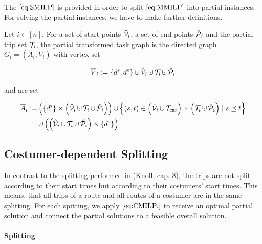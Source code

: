 The $\eqref{eq:SMILP}$ is provided in order to split $\eqref{eq:MMILP}$ into partial instances. For solving the partial instances, we have to make further definitions.

\begin{definition}

Let $i\in[n]$. For a set of start points $\hat{\mathcal{V}}_i$, a set of end points $\hat{\mathcal{P}}_i$ and the partial trip set $\mathcal{T}_i$, the partial transformed task graph is the directed graph $\overline{G}_i=\left(\overline{A}_i,\overline{V}_i\right)$ with vertex set

\begin{align*}
	\overline{V}_i := \left\{\ds,\de\right\}\cupdot\Vhat_i\cupdot\Ti\cupdot\Phat_i
\end{align*}

and arc set

\begin{align*}
	\overline{A}_i := & \left(\left\{\ds\right\}\times\left(\Vhat_i\cupdot\Ti\cupdot\Phat_i\right)\right)\cupdot\left\{(s,t)\in\left(\Vhat_i\cupdot\Tcar\right)\times\left(\Ti\cupdot\Phat_i\right)\mid s\preceq t\right\} \\
	& \cupdot\left(\left(\Vhat_i\cupdot\Ti\cupdot\Phat_i\right)\times\left\{\de\right\}\right)
\end{align*}

\end{definition}


\subsection{Costumer-dependent Splitting}

In contrast to the splitting performed in (Knoll, cap. 8), the trips are not split according to their start times but according to their costumers' start times. This means, that all trips of a route and all routes of a costumer are in the same splitting. For each spitting, we apply $\eqref{eq:CMILPi}$ to receive an optimal partial solution and connect the partial solutions to a feasible overall solution.

\paragraph{Splitting} \parfill

